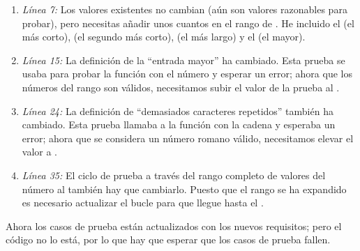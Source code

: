 \begin{enumerate}

\item \emph{Línea 7:} Los valores existentes no cambian (aún son valores razonables para probar), pero necesitas añadir unos cuantos en el rango de . He incluido el  (el más corto),  (el segundo más corto),  (el más largo) y el  (el mayor).

\item \emph{Línea 15:} La definición de la ``entrada mayor'' ha cambiado. Esta prueba se usaba para probar la función  con el número  y esperar un error; ahora que los números del rango  son válidos, necesitamos subir el valor de la prueba al .

\item \emph{Línea 24:} La definición de ``demasiados caracteres repetidos'' también ha cambiado. Esta prueba llamaba a la función  con la cadena  y esperaba un error; ahora que  se considera un número romano válido, necesitamos elevar el valor a .

\item \emph{Línea 35:} El ciclo de prueba a través del rango completo de valores del número  al  también hay que cambiarlo. Puesto que el rango se ha expandido es necesario actualizar el bucle para que llegue hasta el . 

\end{enumerate}

Ahora los casos de prueba están actualizados con los nuevos requisitos; pero el código no lo está, por lo que hay que esperar que los casos de prueba fallen.

